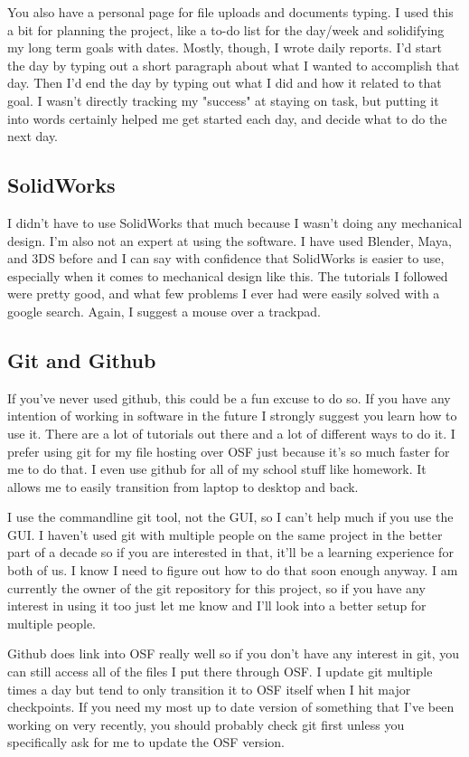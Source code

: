 \documentclass[prb,preprint]{revtex4-1}
\begin{document}
You also have a personal page for file uploads and documents typing. I used this a bit for planning the project, like a to-do list for the day/week and solidifying my long term goals with dates. Mostly, though, I wrote daily reports. I'd start the day by typing out a short paragraph about what I wanted to accomplish that day. Then I'd end the day by typing out what I did and how it related to that goal. I wasn't directly tracking my "success" at staying on task, but putting it into words certainly helped me get started each day, and decide what to do the next day.

\subsection{SolidWorks}
I didn't have to use SolidWorks that much because I wasn't doing any mechanical design. I'm also not an expert at using the software. I have used Blender, Maya, and 3DS before and I can say with confidence that SolidWorks is easier to use, especially when it comes to mechanical design like this. The tutorials I followed were pretty good, and what few problems I ever had were easily solved with a google search. Again, I suggest a mouse over a trackpad.

\subsection{Git and Github}
If you've never used github, this could be a fun excuse to do so. If you have any intention of working in software in the future I strongly suggest you learn how to use it. There are a lot of tutorials out there and a lot of different ways to do it. I prefer using git for my file hosting over OSF just because it's so much faster for me to do that. I even use github for all of my school stuff like homework. It allows me to easily transition from laptop to desktop and back.

I use the commandline git tool, not the GUI, so I can't help much if you use the GUI. I haven't used git with multiple people on the same project in the better part of a decade so if you are interested in that, it'll be a learning experience for both of us. I know I need to figure out how to do that soon enough anyway. I am currently the owner of the git repository for this project, so if you have any interest in using it too just let me know and I'll look into a better setup for multiple people.

Github does link into OSF really well so if you don't have any interest in git, you can still access all of the files I put there through OSF. I update git multiple times a day but tend to only transition it to OSF itself when I hit major checkpoints. If you need my most up to date version of something that I've been working on very recently, you should probably check git first unless you specifically ask for me to update the OSF version.
\end{document}
